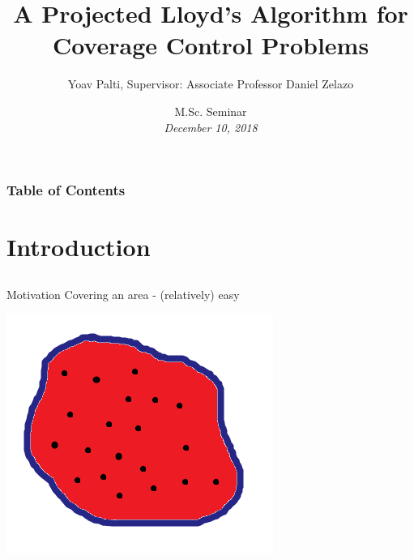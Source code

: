 \documentclass[t]{beamer}
\title{A Projected Lloyd’s Algorithm for Coverage Control Problems}
\author
{Yoav Palti, Supervisor: Associate Professor Daniel Zelazo}
\institute[]
{Faculty of Aerospace Engineering, Technion, Haifa, Israel}
\date[MSc Seminar]
{M.Sc. Seminar \\[1ex]
\footnotesize\em December 10, 2018}
\begin{document}
\begingroup
\renewcommand*\insertshorttitle{}
\renewcommand*\insertshortauthor{}
\renewcommand*\insertshortinstitute{}
\renewcommand*\dohead{\rule{0em}{1.45em}}
\begin{frame}[label=sl1]
  \titlepage
\end{frame}
\endgroup

\begin{frame}
\frametitle{Table of Contents}
\tableofcontents
\end{frame}


\section[Introduction]{Introduction}

\subsection[Motivation]{}
\begin{frame}[label=motivation1]{Motivation}
Covering an area - (relatively) easy
\begin{center}
\includegraphics[scale=0.4]{motivation-figures-no-issue.png}
\end{center}
\end{frame}
\end{document}
